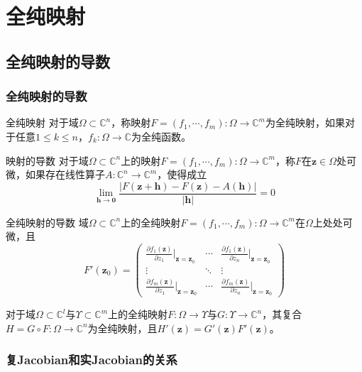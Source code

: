 \documentclass[lang = cn, scheme = chinese, thmcnt = section]{elegantbook}
\newcommand{\C}{\mathbb{C}}  		   %
\newcommand{\sub}{\subset}             %
\newcommand{\bs}{\boldsymbol}          %
\begin{document}
\chapter{全纯映射}

\section{全纯映射的导数}

\subsection{全纯映射的导数}

\begin{definition}{全纯映射}
	对于域$\Omega\sub\C^n$，称映射$F=(f_1,\cdots,f_m):\Omega\to\C^m$为全纯映射，如果对于任意$1\le k\le n$，$f_k:\Omega\to\C$为全纯函数。
\end{definition}

\begin{definition}{映射的导数}
	对于域$\Omega\sub\C^n$上的映射$F=(f_1,\cdots,f_m):\Omega\to\C^m$，称$F$在$\bs{z}\in\Omega$处可微，如果存在线性算子$A:\C^n\to\C^m$，使得成立
	$$
	\lim_{\bs{h}\to \bs{0}}\frac{|F(\bs{z}+\bs{h})-F(\bs{z})-A(\bs{h})|}{|\bs{h}|}=0
	$$
\end{definition}

\begin{theorem}{全纯映射的导数}
	域$\Omega\sub\C^n$上的全纯映射$F=(f_1,\cdots,f_m):\Omega\to\C^m$在$\Omega$上处处可微，且
	$$
	F'(\bs{z}_0)=\begin{pmatrix}
		\frac{\partial f_1(\bs{z})}{\partial z_1}|_{\bs{z}=\bs{z}_0} & \cdots & \frac{\partial f_1(\bs{z})}{\partial z_n}|_{\bs{z}=\bs{z}_0}\\
		\vdots & \ddots & \vdots\\
		\frac{\partial f_m(\bs{z})}{\partial z_1}|_{\bs{z}=\bs{z}_0} & \cdots & \frac{\partial f_m(\bs{z})}{\partial z_n}|_{\bs{z}=\bs{z}_0}
	\end{pmatrix}
	$$
\end{theorem}

\begin{theorem}
	对于域$\Omega\sub \C^{l}$与$\Upsilon\sub \C^{m}$上的全纯映射$F:\Omega\to\Upsilon$与$G:\Upsilon\to\C^n$，其复合$H=G\circ F:\Omega\to\C^n$为全纯映射，且$H'(\bs{z})=G'(\bs{z})F'(\bs{z})$。
\end{theorem}

\subsection{复Jacobian和实Jacobian的关系}
\end{document}
